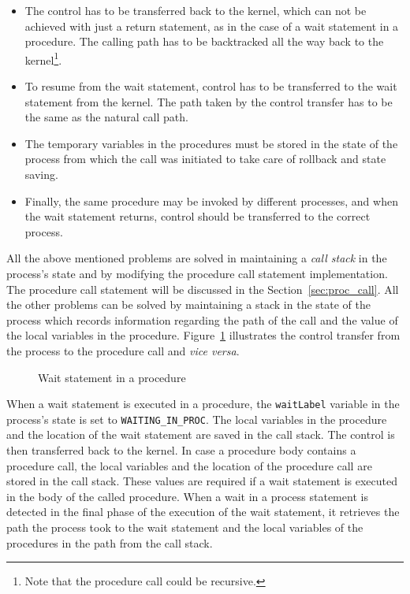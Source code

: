 \documentclass[11pt]{article}
\begin{document}
\begin{itemize}
\item The control has to be transferred back to the kernel, which can not
  be achieved with just a return statement, as in the case of a wait
  statement in a procedure.  The calling path has to be backtracked all
  the way back to the kernel\footnote{Note that the procedure call could
    be recursive.}.
\item To resume from the wait statement, control has to be transferred to
  the wait statement from the kernel.  The path taken by the control
  transfer has to be the same as the natural call path.
\item The temporary variables in the procedures must be stored in the
  state of the process from which the call was initiated to take care of
  rollback and state saving.
\item Finally, the same procedure may be invoked by different processes,
  and when the wait statement returns, control should be transferred to
  the correct process.
\end{itemize}

All the above mentioned problems are solved in \tyvis\/ maintaining a
\textit{call stack} in the process's state and by modifying the procedure
call statement implementation.  The procedure call statement will be
discussed in the Section~\ref{sec:proc_call}.  All the other problems can
be solved by maintaining a stack in the state of the process which records
information regarding the path of the call and the value of the local
variables in the procedure.  Figure~\ref{fig:wait_procedure} illustrates
the control transfer from the process to the procedure call and
\textit{vice versa}.

\begin{figure}[htbp]
  \centerline{}
  \caption{Wait statement in a procedure}
  \label{fig:wait_procedure}
\end{figure}

When a wait statement is executed in a procedure, the \texttt{waitLabel}
variable in the process's state is set to \texttt{WAITING\_IN\_PROC}.  The
local variables in the procedure and the location of the wait statement
are saved in the call stack.  The control is then transferred back to the
kernel.  In case a procedure body contains a procedure call, the local
variables and the location of the procedure call are stored in the call
stack.  These values are required if a wait statement is executed in the
body of the called procedure.  When a wait in a process statement is
detected in the final phase of the execution of the wait statement, it
retrieves the path the process took to the wait statement and the local
variables of the procedures in the path from the call stack.
\end{document}
